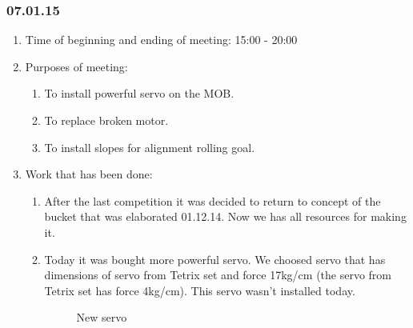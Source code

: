 \subsubsection{07.01.15}

\begin{enumerate}
	\item Time of beginning and ending of meeting: 15:00 - 20:00
	
	\item Purposes of meeting:  
	\begin{enumerate}
		\item To install powerful servo on the MOB.
		
		\item To replace broken motor.
		
		\item To install slopes for alignment rolling goal.
	\end{enumerate}
	
	\item Work that has been done:
	\begin{enumerate}
		
	  \item After the last competition it was decided to return to concept of the bucket that was elaborated 01.12.14. Now we has all resources for making it.
	  
	  \item Today it was bought more powerful servo. We choosed servo that has dimensions of servo from Tetrix set and force 17kg/cm (the servo from Tetrix set has force 4kg/cm). This servo wasn't installed today. 
	  \begin{figure}[H]
	  	\begin{minipage}[h]{1\linewidth}
	  		\caption{New servo}
	  	\end{minipage}
	  \end{figure}
	  	

\end{enumerate}
\end{enumerate}
